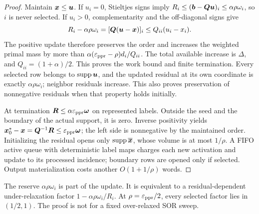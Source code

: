 \begin{proof}
Maintain $\bm{x}\leq\bm{u}$. If $u_i=0$, Stieltjes signs imply
$R_i\leq(\bm{b}-\bm{Q}\bm{u})_i\leq\alpha\rho\omega_i$, so $i$ is never
selected. If $u_i>0$, complementarity and the off-diagonal signs give
\[
 R_i-\alpha\rho\omega_i
   =[\bm{Q}(\bm{u}-\bm{x})]_i\leq Q_{ii}(u_i-x_i).
\]
The positive update therefore preserves the order and increases the
weighted primal mass by more than
$\alpha(\varepsilon_{\mathrm{ppr}}-\rho)d_i/Q_{ii}$.
The total available increase is $\Delta$, and
$Q_{ii}=(1+\alpha)/2$. This proves the work bound and finite termination.
Every selected row belongs to $\operatorname{supp}\bm{u}$, and the updated residual at its
own coordinate is exactly $\alpha\rho\omega_i$; neighbor residuals
increase. This also proves preservation of nonnegative residuals when
that property holds initially.

At termination $\bm R\leq\alpha\varepsilon_{\mathrm{ppr}}\bm{\omega}$ on represented labels.
Outside the seed and the boundary of the actual support, it is zero.
Inverse positivity yields
$\bm{x}_0^*-\bm{x}=\bm{Q}^{-1}\bm R\leq\varepsilon_{\mathrm{ppr}}\bm{\omega}$;
the left side is nonnegative by the maintained order.
Initializing the residual opens only $\operatorname{supp}\overline{\bm{x}}$, whose volume is
at most $1/\rho$. A FIFO active queue with deterministic label maps charges
each new activation and update to its processed incidence; boundary rows
are opened only if selected. Output materialization costs another
$O(1+1/\rho)$ words.
\end{proof}

The reserve $\alpha\rho\omega_i$ is part of the update. It is equivalent
to a residual-dependent under-relaxation factor
$1-\alpha\rho\omega_i/R_i$. At $\rho=\varepsilon_{\mathrm{ppr}}/2$, every selected factor
lies in $(1/2,1)$. The proof is not for a fixed over-relaxed SOR sweep.

